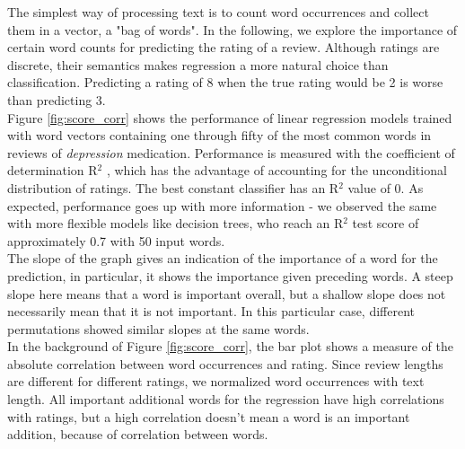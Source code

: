 \documentclass{article}
\begin{document}
The simplest way of processing text is to count word occurrences and collect them in a vector, a "bag of words". In the following, we explore the importance of certain word counts for predicting the rating of a review. Although ratings are discrete, their semantics makes regression a more natural choice than classification. Predicting a rating of 8 when the true rating would be 2 is worse than predicting 3.\\
Figure \ref{fig:score_corr} shows the performance of linear regression models trained with word vectors containing one through fifty of the most common words in reviews of \textit{depression} medication. Performance is measured with the coefficient of determination R$^2$ \citep{wright1921correlation}, which has the advantage of accounting for the unconditional distribution of ratings. The best constant classifier has an R$^2$ value of 0. As expected, performance goes up with more information - we observed the same with more flexible models like decision trees, who reach an R$^2$ test score of approximately 0.7 with 50 input words.\\
The slope of the graph gives an indication of the importance of a word for the prediction, in particular, it shows the importance given preceding words. A steep slope here means that a word is important overall, but a shallow slope does not necessarily mean that it is not important. In this particular case, different permutations showed similar slopes at the same words.\\
In the background of Figure \ref{fig:score_corr}, the bar plot shows a measure of the absolute correlation between word occurrences and rating. Since review lengths are different for different ratings, we normalized word occurrences with text length. All important additional words for the regression have high correlations with ratings, but a high correlation doesn't mean a word is an important addition, because of correlation between words.




\end{document}
